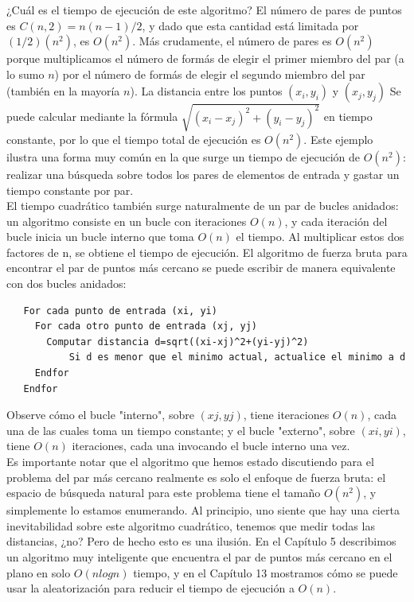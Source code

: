 \documentclass[a4paper]{article}
\begin{document}
¿Cuál es el tiempo de ejecución de este algoritmo? El número de pares de puntos es $C(n,2)=n(n-1)/2$, y dado que esta cantidad está limitada por $(1/2)(n^2)$, es $O(n^2)$. Más crudamente, el número de pares es $O(n^2)$ porque multiplicamos el número de formás de elegir el primer miembro del par (a lo sumo $n$) por el número de formás de elegir el segundo miembro del par (también en la mayoría $n$). La distancia entre los puntos \((x_{i},y_{i})\) y \((x_{j},y_{j})\) Se puede calcular mediante la fórmula
\(\sqrt{(x_{i}-x_{j})^2+(y_{i}-y_{j})^2}\) en tiempo constante, por lo que el tiempo total de ejecución es $O(n^2)$. Este ejemplo ilustra una forma muy común en la que surge un tiempo de ejecución de $O(n^2)$: realizar una búsqueda sobre todos los pares de elementos de entrada y gastar un tiempo constante por par.\\

El tiempo cuadrático también surge naturalmente de un par de bucles anidados: un algoritmo consiste en un bucle con iteraciones $O(n)$, y cada iteración del bucle inicia un bucle interno que toma $O(n)$ el tiempo. Al multiplicar estos dos factores de n, se obtiene el tiempo de ejecución. 
El algoritmo de fuerza bruta para encontrar el par de puntos más cercano se puede escribir de manera equivalente con dos bucles anidados:\\


\begin{lstlisting}
   For cada punto de entrada (xi, yi)
     For cada otro punto de entrada (xj, yj)
       Computar distancia d=sqrt((xi-xj)^2+(yi-yj)^2)
           Si d es menor que el minimo actual, actualice el minimo a d
     Endfor
   Endfor
\end{lstlisting}

Observe cómo el bucle "interno", sobre $(xj,yj)$, tiene iteraciones $O(n)$, cada una de las cuales toma un tiempo constante; y el bucle "externo", sobre $(xi,yi)$, tiene $O(n)$ iteraciones, cada una invocando el bucle interno una vez.\\

Es importante notar que el algoritmo que hemos estado discutiendo para el problema del par más cercano realmente es solo el enfoque de fuerza bruta: el espacio de búsqueda natural para este problema tiene el tamaño $O(n^2)$, y simplemente lo estamos enumerando. Al principio, uno siente que hay una cierta inevitabilidad sobre este algoritmo cuadrático, tenemos que medir todas las distancias, ¿no? Pero de hecho esto es una ilusión. En el Capítulo 5 describimos un algoritmo muy inteligente que encuentra el par de puntos más cercano en el plano en solo $O(nlogn)$ tiempo, y en el Capítulo 13 mostramos cómo se puede usar la aleatorización para reducir el tiempo de ejecución a $O(n)$.\\
\end{document}
